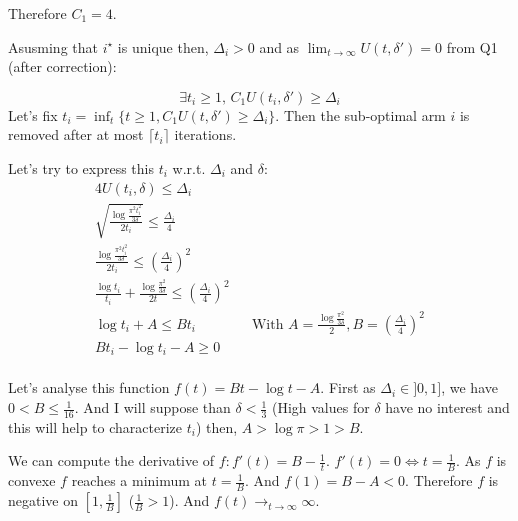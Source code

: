 \documentclass[a4paper]{article}
\begin{document}
Therefore $\boxed{C_1 = 4}$.

Asusming that $i^\star$ is unique then, $\Delta_i > 0$ and as $\lim_{t\rightarrow\infty} U(t, \delta') = 0$ from Q1 (after correction):

\begin{equation*}
    \boxed{\exists t_i\ge 1,\, C_1U(t_i, \delta') \ge \Delta_i}
\end{equation*}
Let's fix $t_i = \inf_t \{t \ge 1, C_1U(t, \delta') \ge \Delta_i\}$. Then the sub-optimal arm $i$ is removed after at most $\lceil t_i \rceil$ iterations.

Let's try to express this $t_i$ w.r.t. $\Delta_i$ and $\delta$:
\begin{equation*}
    \begin{aligned}
        4U(t_i, \delta) \le \Delta_i                                                                                            \\
        \sqrt{\frac{\log\frac{\pi^2t_i^2}{3\delta}}{2t_i}} \le \frac{\Delta_i}{4}                                               \\
        \frac{\log\frac{\pi^2t_i^2}{3\delta}}{2t_i} \le \left(\frac{\Delta_i}{4}\right)^2                                       \\
        \frac{\log t_i}{t_i} + \frac{\log\frac{\pi^2}{3\delta}}{2t} \le \left(\frac{\Delta_i}{4}\right)^2                       \\
        \log{t_i} + A \le Bt_i &  & \text{With } A = \frac{\log\frac{\pi^2}{3\delta}}{2}, B = \left(\frac{\Delta_i}{4}\right)^2 \\
        Bt_i - \log t_i - A \ge 0                                                                                               \\
    \end{aligned}
\end{equation*}

Let's analyse this function $f(t) = Bt - \log t - A$. First as $\Delta_i \in ]0, 1]$, we have $0 < B \le \frac{1}{16}$. And I will suppose than $\delta < \frac{1}{3}$
(High values for $\delta$ have no interest and this will help to characterize $t_i$) then, $A > \log\pi > 1 > B$.

We can compute the derivative of $f: f'(t) = B - \frac{1}{t}$. $f'(t) = 0 \Leftrightarrow t = \frac{1}{B}$. As $f$ is convexe $f$ reaches a minimum
at $t=\frac{1}{B}$. And $f(1) = B - A < 0$. Therefore $f$ is negative on $[1, \frac{1}{B}]$ ($\frac{1}{B} > 1$).
And $f(t) \longrightarrow_{t \rightarrow \infty} \infty$.
\end{document}
